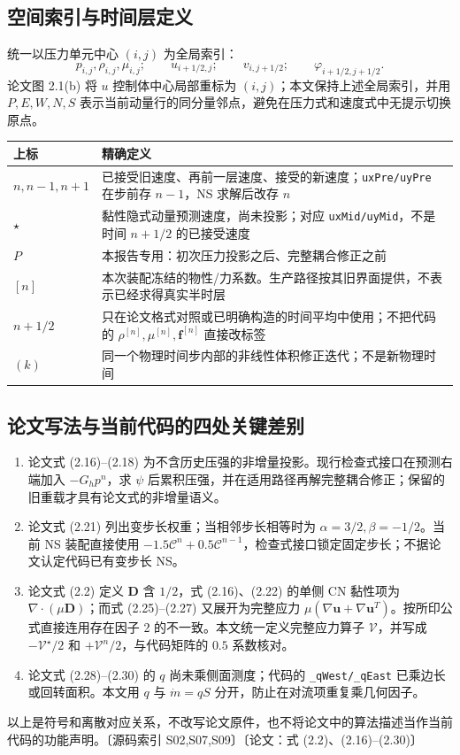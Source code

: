\documentclass[UTF8,a4paper,11pt,fontset=fandol]{ctexart}
\newcommand{\code}[1]{\nolinkurl{#1}}
\newcommand{\src}[1]{\textcolor{ink}{\small〔源码索引 #1〕}}
\newcommand{\thesis}[1]{\textcolor{ink}{\small〔论文：#1〕}}
\newcommand{\vel}{\bm{u}}
\begin{document}
\subsection{空间索引与时间层定义}
统一以压力单元中心 $(i,j)$ 为全局索引：
\begin{equation}
 p_{i,j},\rho_{i,j},\mu_{i,j};\qquad
 u_{i+1/2,j};\qquad v_{i,j+1/2};\qquad
 \varphi_{i+1/2,j+1/2}.
\end{equation}
论文图 2.1(b) 将 $u$ 控制体中心局部重标为 $(i,j)$；本文保持上述全局索引，并用 $P,E,W,N,S$ 表示当前动量行的同分量邻点，避免在压力式和速度式中无提示切换原点。

\begin{longtable}{@{}p{}p{}@{}}
\toprule 上标 & 精确定义\\\midrule\endhead
$n,n-1,n+1$ & 已接受旧速度、再前一层速度、接受的新速度；\code{uxPre/uyPre} 在步前存 $n-1$，NS 求解后改存 $n$\\
$\star$ & 黏性隐式动量预测速度，尚未投影；对应 \code{uxMid/uyMid}，不是时间 $n+1/2$ 的已接受速度\\
$P$ & 本报告专用：初次压力投影之后、完整耦合修正之前\\
$[n]$ & 本次装配冻结的物性/力系数。生产路径按其旧界面提供，不表示已经求得真实半时层\\
$n+1/2$ & 只在论文格式对照或已明确构造的时间平均中使用；不把代码的 $\rho^{[n]},\mu^{[n]},\bm f^{[n]}$ 直接改标签\\
$(k)$ & 同一个物理时间步内部的非线性体积修正迭代；不是新物理时间\\
\bottomrule
\end{longtable}

\subsection{论文写法与当前代码的四处关键差别}
\begin{enumerate}
\item 论文式 (2.16)--(2.18) 为不含历史压强的非增量投影。现行检查式接口在预测右端加入 $-G_hp^n$，求 $\psi$ 后累积压强，并在适用路径再解完整耦合修正；保留的旧重载才具有论文式的非增量语义。
\item 论文式 (2.21) 列出变步长权重；当相邻步长相等时为 $\alpha=3/2,\beta=-1/2$。当前 NS 装配直接使用 $-1.5\mathcal C^n+0.5\mathcal C^{n-1}$，检查式接口锁定固定步长；不据论文认定代码已有变步长 NS。
\item 论文式 (2.2) 定义 $\bm D$ 含 $1/2$，式 (2.16)、(2.22) 的单侧 CN 黏性项为 $\nabla\cdot(\mu\bm D)$；而式 (2.25)--(2.27) 又展开为完整应力 $\mu(\nabla\vel+\nabla\vel^T)$。按所印公式直接连用存在因子 2 的不一致。本文统一定义完整应力算子 $\mathcal V$，并写成 $-\mathcal V^\star/2$ 和 $+\mathcal V^n/2$，与代码矩阵的 $0.5$ 系数核对。
\item 论文式 (2.28)--(2.30) 的 $q$ 尚未乘侧面测度；代码的 \code{_qWest/_qEast} 已乘边长或回转面积。本文用 $q$ 与 $\dot m=qS$ 分开，防止在对流项重复乘几何因子。
\end{enumerate}
以上是符号和离散对应关系，不改写论文原件，也不将论文中的算法描述当作当前代码的功能声明。\src{S02,S07,S09}\thesis{式 (2.2)、(2.16)--(2.30)}
\end{document}

